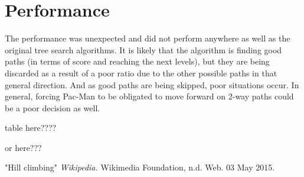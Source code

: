 \documentclass[a4paper,oneside,10pt]{report}
\begin{document}
\section {Performance} \label{custPerf}

The performance was unexpected and did not perform anywhere as well as the original tree search algorithms. It is likely that the algorithm is finding good paths (in terms of score and reaching the next levels), but they are being discarded as a result of a poor ratio due to the other possible paths in that general direction. And as good paths are being skipped, poor situations occur. In general, forcing Pac-Man to be obligated to move forward on 2-way paths could be a poor decision as well.

table here????

or here???




\clearpage
{}
\begin{thebibliography}{9}

"Hill climbing"
\textit{Wikipedia.} 
 Wikimedia Foundation, n.d. Web. 03 May 2015.

\end{thebibliography}

\appendix
\end{document}
